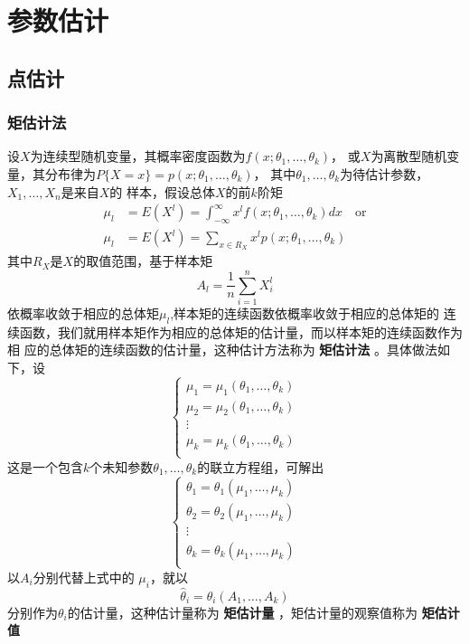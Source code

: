 \documentclass[11pt]{article}
\begin{document}
\section{参数估计}
\label{sec:orgc04ef84}
\subsection{点估计}
\label{sec:orgf6ae8a9}
\subsubsection{矩估计法}
\label{sec:orgeff5b6e}
设\(X\)为连续型随机变量，其概率密度函数为\(f(x;\theta_1,\dots,\theta_k)\)，
或\(X\)为离散型随机变量，其分布律为\(P\{X=x\}=p(x;\theta_1,\dots,\theta_k)\)，
其中\(\theta_1,\dots,\theta_k\)为待估计参数，\(X_1,\dots,X_n\)是来自\(X\)的
样本，假设总体\(X\)的前\(k\)阶矩
\begin{align*}
 \mu_l&=E(X^l)=\int_{-\infty}^\infty x^lf(x;\theta_1,\dots,\theta_k)dx \quad\text{or}\\
 \mu_l&=E(X^l)=\sum_{x\in R_X}x^lp(x;\theta_1,\dots,\theta_k)
\end{align*}
其中\(R_X\)是\(X\)的取值范围，基于样本矩
\begin{equation*}
A_l=\frac{1}{n}\sum_{i=1}^nX_i^l
\end{equation*}
依概率收敛于相应的总体矩\(\mu_l\),样本矩的连续函数依概率收敛于相应的总体矩的
连续函数，我们就用样本矩作为相应的总体矩的估计量，而以样本矩的连续函数作为相
应的总体矩的连续函数的估计量，这种估计方法称为 \textbf{矩估计法} 。具体做法如下，设
\begin{equation*}
\begin{cases}
\mu_1=\mu_1(\theta_1,\dots,\theta_k)\\
\mu_2=\mu_2(\theta_1,\dots,\theta_k)\\
\vdots\\
\mu_k=\mu_k(\theta_1,\dots,\theta_k)\\
\end{cases}
\end{equation*}
这是一个包含\(k\)个未知参数\(\theta_1,\dots,\theta_k\)的联立方程组，可解出
\begin{equation*}
\begin{cases}
\theta_1=\theta_1(\mu_1,\dots,\mu_k)\\
\theta_2=\theta_2(\mu_1,\dots,\mu_k)\\
\vdots\\
\theta_k=\theta_k(\mu_1,\dots,\mu_k)\\
\end{cases}
\end{equation*}
以\(A_i\)分别代替上式中的 \(\mu_i\)，就以
\begin{equation*}
\hat{\theta}_i=\theta_i(A_1,\dots,A_k)
\end{equation*}
分别作为\(\theta_i\)的估计量，这种估计量称为 \textbf{矩估计量} ，矩估计量的观察值称为
\textbf{矩估计值}
\end{document}
